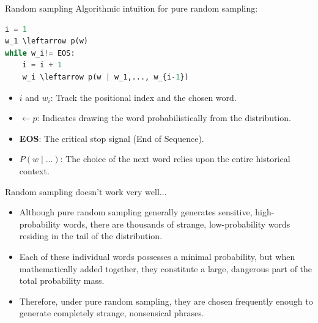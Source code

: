 \documentclass[aspectratio=169]{beamer}
\begin{document}
\begin{frame}[fragile]{Random sampling}\justifying
    Algorithmic intuition for pure random sampling:
    \vspace{0.5cm}
\begin{lstlisting}[language=Python, basicstyle=\ttfamily\small, backgroundcolor=\color{gray!10}, keywordstyle=\color{blue}]
i = 1
w_1 \leftarrow p(w)
while w_i!= EOS:
    i = i + 1
    w_i \leftarrow p(w | w_1,..., w_{i-1})
\end{lstlisting}
    \vspace{0.5cm}
    \begin{itemize}
        \item $i$ and $w_i$: Track the positional index and the chosen word.
        \item $\leftarrow p$: Indicates drawing the word probabilistically from the distribution.
        \item \textbf{EOS}: The critical stop signal (End of Sequence).
        \item $P(w \mid \dots)$: The choice of the next word relies upon the entire historical context.
    \end{itemize}
\end{frame}

\begin{frame}{Random sampling doesn't work very well...}\justifying
    \begin{itemize}
        \item Although pure random sampling generally generates sensitive, high-probability words, there are thousands of strange, low-probability words residing in the tail of the distribution.
        \item Each of these individual words possesses a minimal probability, but when mathematically added together, they constitute a large, dangerous part of the total probability mass.
        \item Therefore, under pure random sampling, they are chosen frequently enough to generate completely strange, nonsensical phrases.
    \end{itemize}
\end{frame}
\end{document}
